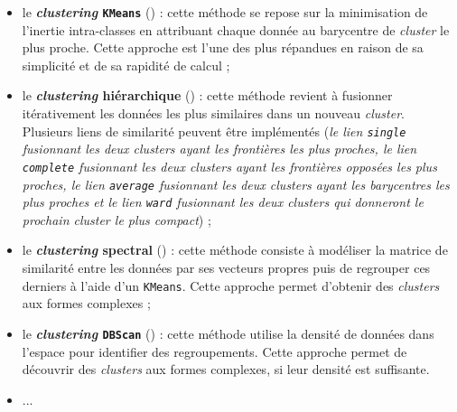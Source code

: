 		\begin{itemize}
			\item le \textbf{\textit{clustering} \texttt{KMeans}} (\cite{macqueen:1967:methods-classification-analysis}) :
			cette méthode se repose sur la minimisation de l'inertie intra-classes en attribuant chaque donnée au barycentre de \textit{cluster} le plus proche.
			Cette approche est l'une des plus répandues en raison de sa simplicité et de sa rapidité de calcul ;
			\item le \textbf{\textit{clustering} hiérarchique} (\cite{murtagh-contreras:2012:algorithms-hierarchical-clustering}) :
			cette méthode revient à fusionner itérativement les données les plus similaires dans un nouveau \textit{cluster}.
			Plusieurs liens de similarité peuvent être implémentés (\textit{le lien \texttt{single} fusionnant les deux \textit{clusters} ayant les frontières les plus proches, le lien \texttt{complete} fusionnant les deux \textit{clusters} ayant les frontières opposées les plus proches, le lien \texttt{average} fusionnant les deux \textit{clusters} ayant les barycentres les plus proches et le lien \texttt{ward} fusionnant les deux \textit{clusters} qui donneront le prochain \textit{cluster} le plus compact}) ;
			\item le \textbf{\textit{clustering} spectral} (\cite{ng-etal:2002:spectral-clustering-analysis}) :
			cette méthode consiste à modéliser la matrice de similarité entre les données par ses vecteurs propres puis de regrouper ces derniers à l'aide d'un \texttt{KMeans}.
			Cette approche permet d'obtenir des \textit{clusters} aux formes complexes ;
			\item le \textbf{\textit{clustering} \texttt{DBScan}} (\cite{ester-etal:1996:densitybased-algorithm-discovering}) :
			cette méthode utilise la densité de données dans l'espace pour identifier des regroupements.
			Cette approche permet de découvrir des \textit{clusters} aux formes complexes, si leur densité est suffisante.
			\item ...
		\end{itemize}
		
